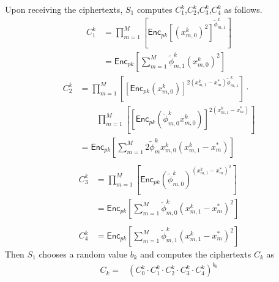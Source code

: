 \documentclass[conference]{IEEEtran}
\begin{document}
Upon receiving the ciphertexts, $S_1$ computes $C_1^k$,$C_2^k$,$C_3^k$,$C_4^k$ as follows.
\begin{equation}
  \begin{split}
  C_1^k & = \prod_{m=1}^M\left[ \mathsf{Enc}_{pk}{\left[\left(x_{m,0}^k\right)^2\right]}^{\tilde{\phi}_{m,1}^k} \right] \\
  & = \mathsf{Enc}_{pk}\left[ \sum_{m=1}^M \tilde{\phi}_{m,1}^k \left(x_{m,0}^k\right)^2\right]
  \end{split}
\end{equation}
\begin{equation}
  \begin{split}
  C_2^k & =  \prod_{m=1}^M\left[ \left[\mathsf{Enc}_{pk}\left(x_{m,0}^k\right)\right]^{2\left(x_{m,1}^k - x_m^*\right)\tilde{\phi}_{m,1}^k}\right] \cdot \\
          & \qquad \prod_{m=1}^M\left[ \left[\mathsf{Enc}_{pk}\left(\tilde{\phi}_{m,0}^k x_{m,0}^k\right)\right]^{2\left(x_{m,1}^k - x_m^*\right)} \right] \\
          & = \mathsf{Enc}_{pk}\left[\sum_{m=1}^M 2\tilde{\phi}_m^k x_{m,0}^k\left(x_{m,1}^k - x_m^*\right)\right]  \\
  \end{split}
\end{equation}
\begin{equation}
  \begin{split}
    C_3^k & = \prod_{m=1}^M\left[ \mathsf{Enc}_{pk}\left(\tilde{\phi}_{m,0}^k\right)^{\left(x_{m,1}^k - x_m^*\right)^2} \right] \\
    & = \mathsf{Enc}_{pk}\left[\sum_{m=1}^M \tilde{\phi}_{m,0}^k\left(x_{m,1}^k - x_m^*\right)^2\right] \\
  \end{split}
\end{equation}
\begin{equation}
  \begin{split}
    C_4^k & = \mathsf{Enc}_{pk}\left[\sum_{m=1}^M \tilde{\phi}_{m,1}^k \left(x_{m,1}^k - x_m^*\right)^2\right]
  \end{split}
\end{equation}
Then $S_1$ chooses a random value $b_k$ and computes the ciphertexts $C_k$ as 
\begin{equation}
  \begin{split}
    C_k = & \left(C_0^k\cdot C_1^k\cdot C_2^k\cdot C_3^k \cdot C_4^k\right)^{b_k} \\
  \end{split}
\end{equation}
\end{document}
